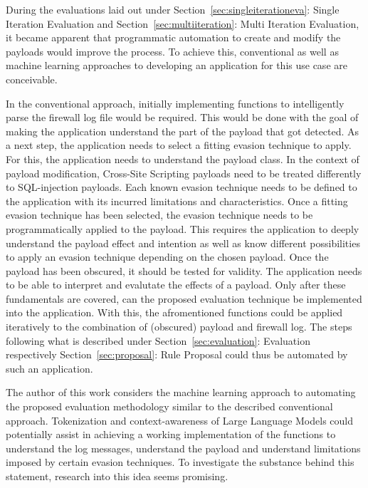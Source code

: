 During the evaluations laid out under Section~\ref{sec:singleiterationeva}: Single Iteration Evaluation and Section~\ref{sec:multiiteration}: Multi Iteration Evaluation, it became apparent that programmatic automation to create and modify the payloads would improve the process. To achieve this, conventional as well as machine learning approaches to developing an application for this use case are conceivable.

In the conventional approach, initially implementing functions to intelligently parse the firewall log file would be required. 
This would be done with the goal of making the application understand the part of the payload that got detected.
As a next step, the application needs to select a fitting evasion technique to apply. For this, the application needs to understand the payload class. In the context of payload modification, Cross-Site Scripting payloads need to be treated differently to SQL-injection payloads. 
Each known evasion technique needs to be defined to the application with its incurred limitations and characteristics. 
Once a fitting evasion technique has been selected, the evasion technique needs to be programmatically applied to the payload. 
This requires the application to deeply understand the payload effect and intention as well as know different possibilities to apply an evasion technique depending on the chosen payload. Once the payload has been obscured, it should be tested for validity. 
The application needs to be able to interpret and evalutate the effects of a payload. 
Only after these fundamentals are covered, can the proposed evaluation technique be implemented into the application. 
With this, the afromentioned functions could be applied iteratively to the combination of (obscured) payload and firewall log. 
The steps following what is described under Section~\ref{sec:evaluation}: Evaluation respectively Section~\ref{sec:proposal}: Rule Proposal could thus be automated by such an application.

The author of this work considers the machine learning approach to automating the proposed evaluation methodology similar to the described conventional approach.
Tokenization and context-awareness of Large Language Models could potentially assist in achieving a working implementation of the functions to understand the log messages, understand the payload and understand limitations imposed by certain evasion techniques. 
To investigate the substance behind this statement, research into this idea seems promising. 

